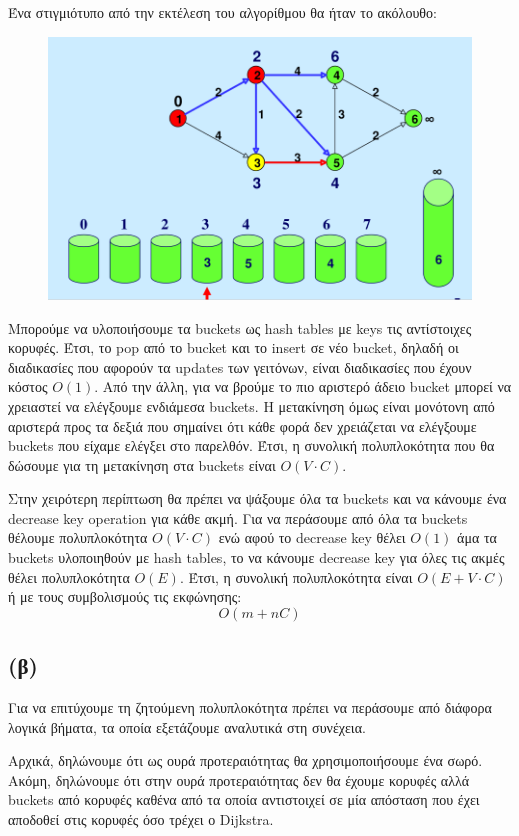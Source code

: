 \documentclass[a4paper,oneside, 11pt]{article}
\begin{document}
Ένα στιγμιότυπο από την εκτέλεση του αλγορίθμου θα ήταν το ακόλουθο:
\begin{figure}[H]
	\includegraphics[width=\textwidth]{dijkstra_bounded.png}
\end{figure}

Μπορούμε να υλοποιήσουμε τα buckets ως hash tables με keys τις αντίστοιχες κορυφές. Έτσι, το pop από το bucket και το insert σε νέο bucket, δηλαδή οι διαδικασίες που αφορούν τα updates των γειτόνων, είναι διαδικασίες που έχουν κόστος $O(1)$. Από την άλλη, για να βρούμε το πιο αριστερό άδειο bucket μπορεί να χρειαστεί να ελέγξουμε ενδιάμεσα buckets. Η μετακίνηση όμως είναι μονότονη από αριστερά προς τα δεξιά που σημαίνει ότι κάθε φορά δεν χρειάζεται να ελέγξουμε buckets που είχαμε ελέγξει στο παρελθόν. Έτσι, η συνολική πολυπλοκότητα που θα δώσουμε για τη μετακίνηση στα buckets είναι $O(V \cdot C)$.
\bigbreak 

Στην χειρότερη περίπτωση θα πρέπει να ψάξουμε όλα τα buckets και να κάνουμε ένα decrease key operation για κάθε ακμή. Για να περάσουμε από όλα τα buckets θέλουμε πολυπλοκότητα $O(V\cdot C)$ ενώ αφού το decrease key θέλει $O(1)$ άμα τα buckets υλοποιηθούν με hash tables, το να κάνουμε decrease key για όλες τις ακμές θέλει πολυπλοκότητα $O(E)$. Έτσι, η συνολική πολυπλοκότητα είναι $O(E + V\cdot C)$ ή με τους συμβολισμούς τις εκφώνησης:
$$
O(m + nC)
$$

\subsection{(β)}
Για να επιτύχουμε τη ζητούμενη πολυπλοκότητα πρέπει να περάσουμε από διάφορα λογικά βήματα, τα οποία εξετάζουμε αναλυτικά στη συνέχεια.  \bigbreak 

Αρχικά, δηλώνουμε ότι ως ουρά προτεραιότητας θα χρησιμοποιήσουμε ένα σωρό. Ακόμη, δηλώνουμε ότι στην ουρά προτεραιότητας δεν θα έχουμε κορυφές αλλά buckets από κορυφές καθένα από τα οποία αντιστοιχεί σε μία απόσταση που έχει αποδοθεί στις κορυφές όσο τρέχει ο Dijkstra. \bigbreak 
\end{document}
